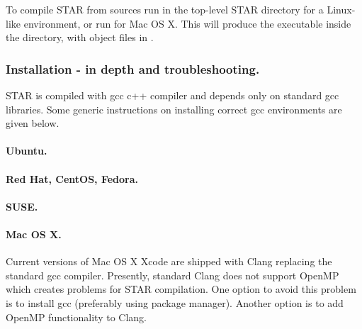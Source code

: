 \documentclass[12pt]{article}
\begin{document}
To compile STAR from sources run  in the top-level STAR directory for a Linux-like environment, or run  for Mac OS X. This will produce the executable  inside the  directory, with object files in .

\subsubsection{Installation - in depth and troubleshooting.}
STAR is compiled with gcc c++ compiler and depends only on standard gcc libraries. Some generic instructions on installing correct gcc environments are given below.

\paragraph{Ubuntu.}\hfill
{}

\paragraph{Red Hat, CentOS, Fedora.}\hfill
{}

\paragraph{SUSE.}\hfill
{}

\paragraph{Mac OS X.\newline}
Current versions of Mac OS X Xcode are shipped with Clang replacing the standard gcc compiler. Presently, standard Clang does not support OpenMP which creates problems for STAR compilation. One option to avoid this problem is to install gcc (preferably using  package manager). Another option is to add OpenMP functionality to Clang.
\end{document}

